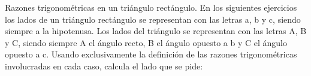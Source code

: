\documentclass[spanish, 11pt]{exam}
\begin{document}
\begin{questions}
\begin{multicols}{2}
\begin{parts}
\end{parts}
\end{multicols}







\question Razones trigonométricas en un triángulo rectángulo. En los siguientes ejercicios los lados de un triángulo
rectángulo se representan con las letras a, b y c, siendo siempre a la hipotenusa. Los lados del triángulo se
representan con las letras A, B y C, siendo siempre A el ángulo recto, B el ángulo opuesto a b y C el ángulo
opuesto a c. Usando exclusivamente la definición de las razones trigonométricas involucradas en cada caso,
calcula el lado que se pide:
\begin{multicols}{2}
\end{multicols}
\end{questions}
\end{document}
